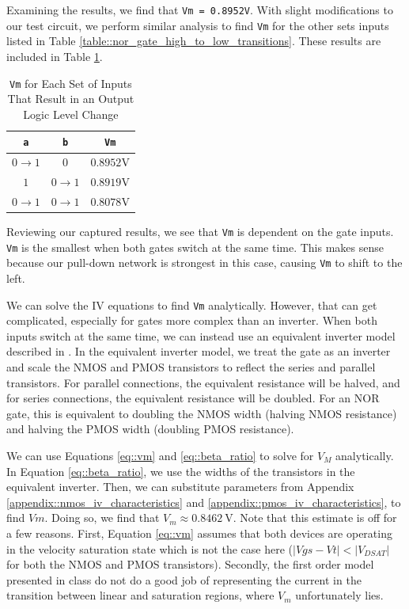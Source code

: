\documentclass[fleqn]{article}
\begin{document}
	Examining the results, we find that \texttt{Vm = 0.8952V}. With slight modifications to our test circuit, we perform similar analysis to find \texttt{Vm} for the other sets inputs listed in Table \ref{table::nor_gate_high_to_low_transitions}. These results are included in Table \ref{table::nor_gate_vm}.
	
	\begin{table}[H]
	\begin{center}
	\caption{\texttt{Vm} for Each Set of Inputs That Result in an Output Logic Level Change}
	\label{table::nor_gate_vm}
	\begin{tabular}{| c | c | c |}
		\hline
		\texttt{a} & \texttt{b} & \texttt{Vm}\\
		\hline	
		$0 \rightarrow 1$ & $0$ & $0.8952 \text{V}$\\
		\hline	
		$1$ & $0 \rightarrow 1$ & $0.8919 \text{V}$\\
		\hline	
		$0 \rightarrow 1$ & $0 \rightarrow 1$ & $0.8078 \text{V}$\\
		\hline
	\end{tabular}
	\end{center}
	\end{table}
	
	\noindent Reviewing our captured results, we see that \texttt{Vm} is dependent on the gate inputs. \texttt{Vm} is the smallest when both gates switch at the same time. This makes sense because our pull-down network is strongest in this case, causing \texttt{Vm} to shift to the left.
	
	We can solve the IV equations to find \texttt{Vm} analytically. However, that can get complicated, especially for gates more complex than an inverter. When both inputs switch at the same time, we can instead use an equivalent inverter model described in \cite{cmos_vlsi_design, equivalent_inverter, inverter_dc_analysis}. In the equivalent inverter model, we treat the gate as an inverter and scale the NMOS and PMOS transistors to reflect the series and parallel transistors. For parallel connections, the equivalent resistance will be halved, and for series connections, the equivalent resistance will be doubled. For an NOR gate, this is equivalent to doubling the NMOS width (halving NMOS resistance) and halving the PMOS width (doubling PMOS resistance).
	
	\noindent We can use Equations \ref{eq::vm} and \ref{eq::beta_ratio} to solve for $V_M$ analytically. In Equation \ref{eq::beta_ratio}, we use the widths of the transistors in the equivalent inverter. Then, we can substitute parameters from Appendix \ref{appendix::nmos_iv_characteristics} and \ref{appendix::pmos_iv_characteristics}, to find $Vm$. Doing so, we find that $V_m \approx 0.8462\ \text{V}$. Note that this estimate is off for a few reasons. First, Equation \ref{eq::vm} assumes that both devices are operating in the velocity saturation state which is not the case here ($|Vgs - Vt| < |V_{DSAT}|$ for both the NMOS and PMOS transistors). Secondly, the first order model presented in class do not do a good job of representing the current in the transition between linear and saturation regions, where $V_m$ unfortunately lies. 
	
\end{document}
